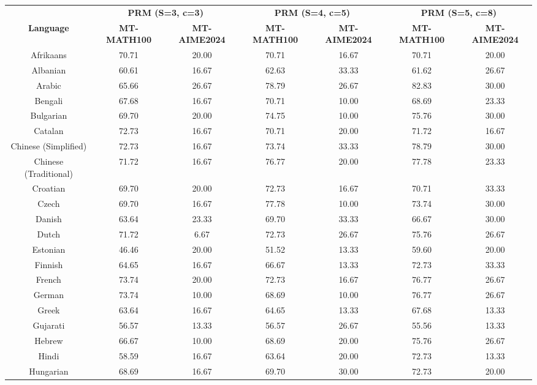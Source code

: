 \begin{table*}[]
\centering
\fontsize{7}{10} \selectfont
\begin{tabular}{c|cc|cc|cc}
\toprule
 & \multicolumn{2}{c|}{\textbf{PRM (S=3, c=3)}} & \multicolumn{2}{c|}{\textbf{PRM (S=4, c=5)}} & \multicolumn{2}{c}{\textbf{PRM (S=5, c=8)}} \\ \cmidrule{2-7}
\multirow{-2}{*}{\textbf{Language}} & \textbf{MT-MATH100} & \textbf{MT-AIME2024} & \textbf{MT-MATH100} & \textbf{MT-AIME2024} & \textbf{MT-MATH100} & \textbf{MT-AIME2024} \\ \midrule
Afrikaans & 70.71 & 20.00 & 70.71 & 16.67 & 70.71 & 20.00 \\
Albanian & 60.61 & 16.67 & 62.63 & 33.33 & 61.62 & 26.67 \\
Arabic & 65.66 & 26.67 & 78.79 & 26.67 & 82.83 & 30.00 \\
Bengali & 67.68 & 16.67 & 70.71 & 10.00 & 68.69 & 23.33 \\
Bulgarian & 69.70 & 20.00 & 74.75 & 10.00 & 75.76 & 30.00 \\
Catalan & 72.73 & 16.67 & 70.71 & 20.00 & 71.72 & 16.67 \\
Chinese (Simplified) & 72.73 & 16.67 & 73.74 & 33.33 & 78.79 & 30.00 \\
Chinese (Traditional) & 71.72 & 16.67 & 76.77 & 20.00 & 77.78 & 23.33 \\
Croatian & 69.70 & 20.00 & 72.73 & 16.67 & 70.71 & 33.33 \\
Czech & 69.70 & 16.67 & 77.78 & 10.00 & 73.74 & 30.00 \\
Danish & 63.64 & 23.33 & 69.70 & 33.33 & 66.67 & 30.00 \\
Dutch & 71.72 & 6.67 & 72.73 & 26.67 & 75.76 & 26.67 \\
Estonian & 46.46 & 20.00 & 51.52 & 13.33 & 59.60 & 20.00 \\
Finnish & 64.65 & 16.67 & 66.67 & 13.33 & 72.73 & 33.33 \\
French & 73.74 & 20.00 & 72.73 & 16.67 & 76.77 & 26.67 \\
German & 73.74 & 10.00 & 68.69 & 10.00 & 76.77 & 26.67 \\
Greek & 63.64 & 16.67 & 64.65 & 13.33 & 67.68 & 13.33 \\
Gujarati & 56.57 & 13.33 & 56.57 & 26.67 & 55.56 & 13.33 \\
Hebrew & 66.67 & 10.00 & 68.69 & 20.00 & 75.76 & 26.67 \\
Hindi & 58.59 & 16.67 & 63.64 & 20.00 & 72.73 & 13.33 \\
Hungarian & 68.69 & 16.67 & 69.70 & 30.00 & 72.73 & 20.00 \\

\end{tabular}
\end{table*}
